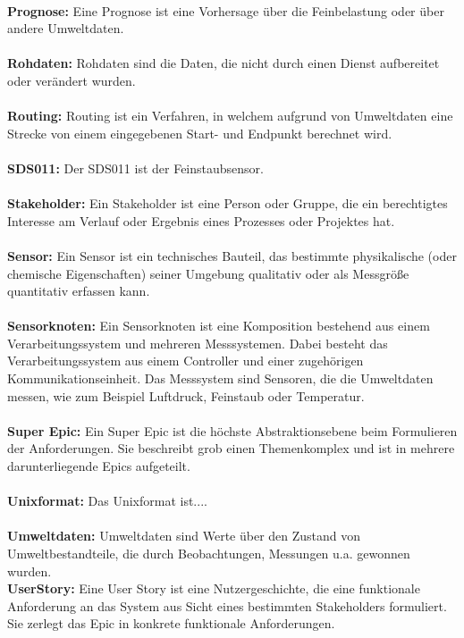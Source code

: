 \\
\textbf{Prognose:} Eine Prognose ist eine Vorhersage über die Feinbelastung oder über andere Umweltdaten. \\
\\
\textbf{Rohdaten:} Rohdaten sind die Daten, die nicht durch einen Dienst aufbereitet oder verändert wurden. \\
\\
\textbf{Routing:}
Routing ist ein Verfahren, in welchem aufgrund von Umweltdaten eine Strecke von einem eingegebenen Start- und Endpunkt berechnet wird.\\
\\
\textbf{SDS011:} Der SDS011 ist der Feinstaubsensor.\\
\\
\textbf{Stakeholder:} Ein Stakeholder ist eine Person oder Gruppe, die ein berechtigtes Interesse am Verlauf oder Ergebnis eines Prozesses oder Projektes hat. \\
\\
\textbf{Sensor:} Ein Sensor ist ein technisches Bauteil, das bestimmte physikalische (oder chemische Eigenschaften) seiner Umgebung qualitativ oder als Messgröße quantitativ erfassen kann.\\
\\
\textbf{Sensorknoten:} Ein Sensorknoten ist eine Komposition bestehend aus einem Verarbeitungssystem und mehreren Messsystemen. Dabei besteht das Verarbeitungssystem aus einem Controller und einer zugehörigen Kommunikationseinheit. Das Messsystem sind Sensoren, die die Umweltdaten messen, wie zum Beispiel Luftdruck, Feinstaub oder Temperatur. \\
\\
\textbf{Super Epic:} Ein Super Epic ist die höchste Abstraktionsebene beim Formulieren der Anforderungen. Sie beschreibt grob einen Themenkomplex und ist in mehrere darunterliegende Epics aufgeteilt. \\
\\
\textbf{Unixformat:}
Das Unixformat ist....\\
\\
\textbf{Umweltdaten:} Umweltdaten sind Werte über den Zustand von Umweltbestandteile, die durch Beobachtungen, Messungen u.a. gewonnen wurden.
\\
\textbf{UserStory:} Eine User Story ist eine Nutzergeschichte, die eine funktionale Anforderung an das System aus Sicht eines bestimmten Stakeholders formuliert. Sie zerlegt das Epic in konkrete funktionale Anforderungen.  \\
